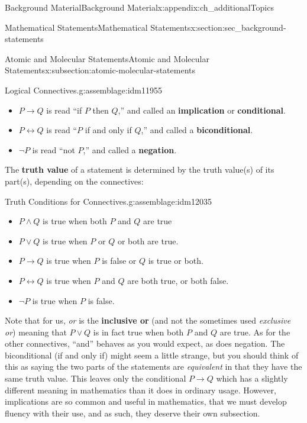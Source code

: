 \documentclass[oneside,10pt,]{book}
\newcommand{\terminology}[1]{\textbf{#1}}
\numberwithin{equation}{chapter}
\def\iff{\leftrightarrow}
\def\imp{\rightarrow}
\begin{document}
\begin{appendixptx}{Background Material}{}{Background Material}{}{}{x:appendix:ch_additionalTopics}
\begin{sectionptx}{Mathematical Statements}{}{Mathematical Statements}{}{}{x:section:sec_background-statements}
\begin{subsectionptx}{Atomic and Molecular Statements}{}{Atomic and Molecular Statements}{}{}{x:subsection:atomic-molecular-statements}
\begin{assemblage}{Logical Connectives.}{g:assemblage:idm11955}
\begin{itemize}[label=\textbullet]
\item{}\(P \imp Q\) is read ``if \(P\) then \(Q\),'' and called an \terminology{implication} or \terminology{conditional}.    %
\item{}\(P \iff Q\) is read ``\(P\) if and only if \(Q\),'' and called a \terminology{biconditional}.   %
\item{}\(\neg P\) is read ``not \(P\),'' and called a \terminology{negation}.  \label{g:notation:idm12030}%
\end{itemize}
%
\end{assemblage}
The \terminology{truth value} of a statement is determined by the truth value(s) of its part(s), depending on the connectives:%
\begin{assemblage}{Truth Conditions for Connectives.}{g:assemblage:idm12035}%
%
\begin{itemize}[label=\textbullet]
\item{}\(P \wedge Q\) is true when both \(P\) and \(Q\) are true%
\item{}\(P \vee Q\) is true when \(P\) or \(Q\) or both are true.%
\item{}\(P \imp Q\) is true when \(P\) is false or \(Q\) is true or both.%
\item{}\(P \iff Q\) is true when \(P\) and \(Q\) are both true, or both false.%
\item{}\(\neg P\) is true when \(P\) is false.%
\end{itemize}
%
\end{assemblage}
Note that for us, \emph{or} is the \terminology{inclusive or}  (and not the sometimes used \emph{exclusive or}) meaning that \(P \vee Q\) is in fact true when both \(P\) and \(Q\) are true. As for the other connectives, ``and'' behaves as you would expect, as does negation. The biconditional (if and only if) might seem a little strange, but you should think of this as saying the two parts of the statements are \emph{equivalent} in that they have the same truth value. This leaves only the conditional \(P \imp Q\) which has a slightly different meaning in mathematics than it does in ordinary usage. However, implications are so common and useful in mathematics, that we must develop fluency with their use, and as such, they deserve their own subsection.%
\end{subsectionptx}

\end{sectionptx}
\end{appendixptx}
\end{document}
